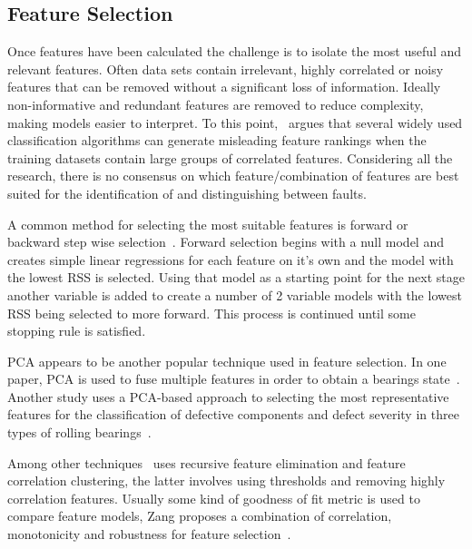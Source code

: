 \documentclass[]{article}
\begin{document}
\subsection{Feature Selection}
Once features have been calculated the challenge is to isolate the most useful and relevant features. Often data sets contain irrelevant, highly correlated or noisy features that can be removed without a significant loss of information. Ideally non-informative and redundant features are removed to reduce complexity, making models easier to interpret. To this point,~\cite{tolocsi2011classification} argues that several widely used classification algorithms can generate misleading feature rankings when the training datasets contain large groups of correlated features. Considering all the research, there is no consensus on which feature/combination of features are best suited for the identification of and distinguishing between faults. 

A common method for selecting the most suitable features is forward or backward step wise selection~\cite{james2013introduction}. Forward selection begins with a null model and creates simple linear regressions for each feature on it's own and the model with the lowest RSS is selected. Using that model as a starting point for the next stage another variable is added to create a number of 2 variable models with the lowest RSS being selected to more forward. This process is continued until some stopping rule is satisfied.

\gls{PCA} appears to be another popular technique used in feature selection. In one paper, PCA is used to fuse multiple features in order to obtain a bearings state~\cite{lu2016degradation}. Another study uses a PCA-based approach to selecting the most representative features for the classification of defective components and defect severity in three types of rolling bearings~\cite{malhi2004pca}. 

Among other techniques~\cite{buckley2023feature} uses recursive feature elimination and feature correlation clustering, the latter involves using thresholds and removing highly correlation features. Usually some kind of goodness of fit metric is used to compare feature models, Zang proposes a combination of correlation, monotonicity and robustness for feature selection~\cite{zhang2016degradation}.

\end{document}
